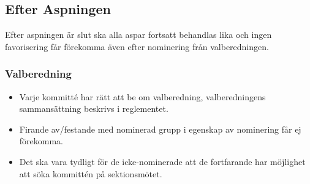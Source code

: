 \subsection{Efter Aspningen}
Efter aspningen är slut ska alla aspar fortsatt behandlas lika och ingen favorisering får förekomma även efter nominering från valberedningen. 
\subsubsection{Valberedning}
\begin{itemize}
    \item Varje kommitté har rätt att be om valberedning, valberedningens sammansättning beskrivs i reglementet. 
    \item Firande av/festande med nominerad grupp i egenskap av nominering får ej förekomma. 
    \item Det ska vara tydligt för de icke-nominerade att de fortfarande har möjlighet att söka kommittén på sektionsmötet. 
\end{itemize}

